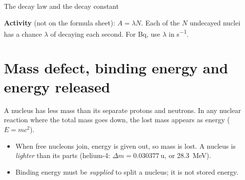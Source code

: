 \begin{formulacard}{The decay law and the decay constant}
  \begin{symbols}
  \end{symbols}
\end{formulacard}

\textbf{Activity} (not on the formula sheet): $A = \lambda N$. Each of the $N$ undecayed
nuclei has a chance $\lambda$ of decaying each second. For Bq, use $\lambda$ in \si{s^{-1}}.

\section{Mass defect, binding energy and energy released}\label{ch4:sec:binding}

\begin{bigidea}
A nucleus has less mass than its separate protons and neutrons. In any nuclear reaction
where the total mass goes down, the lost mass appears as energy ($E = mc^2$).
\end{bigidea}

\begin{keywords}
\end{keywords}

\begin{itemize}
  \item When free nucleons join, energy is given out, so mass is lost. A nucleus is
        \emph{lighter} than its parts (helium-4: $\Delta m = \qty{0.030377}{\amu}$, or
        \qty{28.3}{MeV}).
  \item Binding energy must be \emph{supplied} to split a nucleus; it is not stored energy.
\end{itemize}

